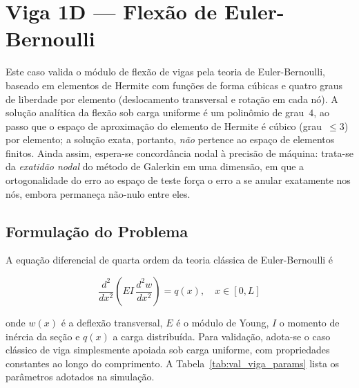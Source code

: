 
\section{Viga 1D --- Flexão de Euler-Bernoulli}
\label{sec:val_viga}

Este caso valida o módulo de flexão de vigas pela teoria de Euler-Bernoulli, baseado em elementos de Hermite com funções de forma cúbicas e quatro graus de liberdade por elemento (deslocamento transversal e rotação em cada nó). A solução analítica da flexão sob carga uniforme é um polinômio de grau~$4$, ao passo que o espaço de aproximação do elemento de Hermite é cúbico (grau~$\leq 3$) por elemento; a solução exata, portanto, \emph{não} pertence ao espaço de elementos finitos. Ainda assim, espera-se concordância nodal à precisão de máquina: trata-se da \emph{exatidão nodal} do método de Galerkin em uma dimensão, em que a ortogonalidade do erro ao espaço de teste força o erro a se anular exatamente nos nós, embora permaneça não-nulo entre eles.

\subsection{Formulação do Problema}

A equação diferencial de quarta ordem da teoria clássica de Euler-Bernoulli é

\begin{equation}
    \frac{d^2}{dx^2}\!\left( E I \, \frac{d^2 w}{dx^2} \right) = q(x), \quad x \in [0, L]
    \label{eq:val_viga_edp}
\end{equation}

\noindent onde $w(x)$ é a deflexão transversal, $E$ é o módulo de Young, $I$ o momento de inércia da seção e $q(x)$ a carga distribuída. Para validação, adota-se o caso clássico de viga simplesmente apoiada sob carga uniforme, com propriedades constantes ao longo do comprimento. A Tabela~\ref{tab:val_viga_params} lista os parâmetros adotados na simulação.

